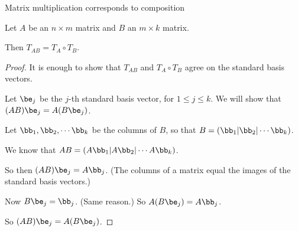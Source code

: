\documentclass{beamer}
\begin{document}
\beamerdefaultoverlayspecification{}
\begin{frame}{Matrix multiplication corresponds to composition}

\begin{theorem}
Let $A$ be an $n\times m$ matrix and $B$ an $m\times k$ matrix.

\pause

Then $T_{AB} = T_A \circ T_B$.
\end{theorem}

\pause

\begin{proof}
It is enough to show that $T_{AB}$ and $T_A \circ T_B$ agree on the standard
basis vectors.

\pause

Let $\be_j$ be the $j$-th standard basis vector, for $1\leq j\leq k$. We will show that
$(AB)\be_j = A (B \be_j)$.

\pause

Let $\bb_1, \bb_2,\cdots \bb_k$ be the columns of $B$, so that
$B = (\bb_1 \vert \bb_2 \vert \cdots \bb_k)$.

 \pause

 We know that $AB = (A \bb_1 \vert A \bb_2 \vert \cdots A \bb_k)$.

 \pause

 So then $(AB)\be_j = A\bb_j$. (The columns of a matrix equal the images of the standard basis vectors.)

 \pause

 Now $B \be_j = \bb_j$. (Same reason.) So $A (B \be_j) = A\bb_j$.

 \pause

 So $(AB)\be_j = A (B \be_j)$.

\end{proof}

\end{frame}

\end{document}
